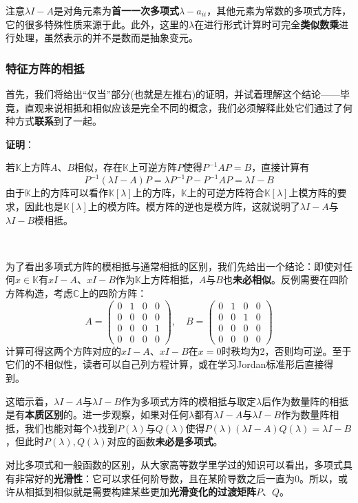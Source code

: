 \documentclass[a4paper,UTF8,fontset=windows,AutoFakeBold]{ctexart}
\newcommand*{\note}{\noindent *}
\newcommand{\proo}[1]{{\vspace{5pt}\kaishu\noindent\textbf{证明}：\vspace{-3pt}
\begin{compactitem}
    \item[] #1
\end{compactitem}
}}
\begin{document}
\note 注意$\lambda I-A$是对角元素为\textbf{首一一次多项式}$\lambda-a_{ii}$，其他元素为常数的多项式方阵，它的很多特殊性质来源于此。此外，这里的$\lambda$在进行形式计算时可完全\textbf{类似数乘}进行处理，虽然表示的并不是数而是抽象变元。

\subsubsection{特征方阵的相抵}
首先，我们将给出``仅当''部分(也就是左推右)的证明，并试着理解这个结论——毕竟，直观来说相抵和相似应该是完全不同的概念，我们必须解释此处它们通过了何种方式\textbf{联系}到了一起。

\proo{
    若$\mathbb{K}$上方阵$A$、$B$相似，存在$\mathbb{K}$上可逆方阵$P$使得$P^{-1}AP=B$，直接计算有
    $$P^{-1}(\lambda I-A)P=\lambda P^{-1}P-P^{-1}AP=\lambda I-B$$
    由于$\mathbb{K}$上的方阵可以看作$\mathbb{K}[\lambda]$上的方阵，$\mathbb{K}$上的可逆方阵符合$\mathbb{K}[\lambda]$上模方阵的要求，因此也是$\mathbb{K}[\lambda]$上的模方阵。模方阵的逆也是模方阵，这就说明了$\lambda I-A$与$\lambda I-B$模相抵。
}

\

为了看出多项式方阵的模相抵与通常相抵的区别，我们先给出一个结论：即使对任何$x\in\mathbb{K}$有$xI-A$、$xI-B$作为$\mathbb{K}$上方阵相抵，$A$与$B$也\textbf{未必相似}。反例需要在四阶方阵构造，考虑$\mathbb{C}$上的四阶方阵：
$$A=\begin{pmatrix}0&1&0&0\\0&0&0&0\\0&0&0&1\\0&0&0&0\end{pmatrix},\quad B=\begin{pmatrix}0&1&0&0\\0&0&1&0\\0&0&0&0\\0&0&0&0\end{pmatrix}$$
计算可得这两个方阵对应的$xI-A$、$xI-B$在$x=0$时秩均为2，否则均可逆。至于它们的不相似性，读者可以自己列方程计算，或在学习Jordan标准形后直接得到。

这暗示着，$\lambda I-A$与$\lambda I-B$作为多项式方阵的模相抵与取定$\lambda$后作为数量阵的相抵是有\textbf{本质区别}的。进一步观察，如果对任何$\lambda$都有$\lambda I-A$与$\lambda I-B$作为数量阵相抵，我们也能对每个$\lambda$找到$P(\lambda)$与$Q(\lambda)$使得$P(\lambda)(\lambda I-A)Q(\lambda)=\lambda I-B$，但此时$P(\lambda),Q(\lambda)$对应的函数\textbf{未必是多项式}。

对比多项式和一般函数的区别，从大家高等数学里学过的知识可以看出，多项式具有非常好的\textbf{光滑性}：它可以求任何阶导数，且在某阶导数之后一直为0。所以，或许从相抵到相似就是需要构建某些更加\textbf{光滑变化的过渡矩阵}$P$、$Q$。
\end{document}
